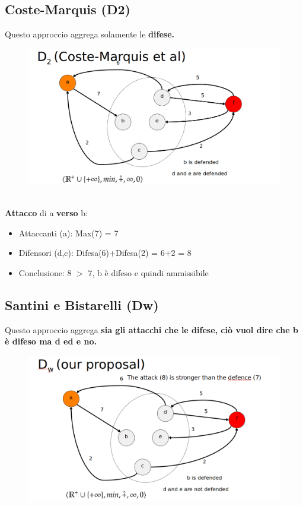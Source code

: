 \subsection{Coste-Marquis (D2)}
Questo approccio aggrega solamente le \textbf{difese.}
\begin{figure}[htp]
	\centering
    \includegraphics[width=13cm, keepaspectratio]{latex/img/Cap6/marquis2.png}
\end{figure}
\\\textbf{Attacco} di a \textbf{verso} b:
\begin{itemize}
    \item Attaccanti (a): Max(7) = 7
    \item Difensori (d,c): Difesa(6)+Difesa(2) = 6+2 = 8
    \item Conclusione: 8 $>$ 7, b è difeso e quindi ammissibile
\end{itemize}

\subsection{Santini e Bistarelli (Dw)}
Questo approccio aggrega \textbf{sia gli attacchi che le difese, ciò vuol dire che b è difeso ma d ed e no.}

\begin{figure}[htp]
	\centering
    \includegraphics[width=13cm, keepaspectratio]{img/Cap6/bistarelli2.png}
\end{figure}

